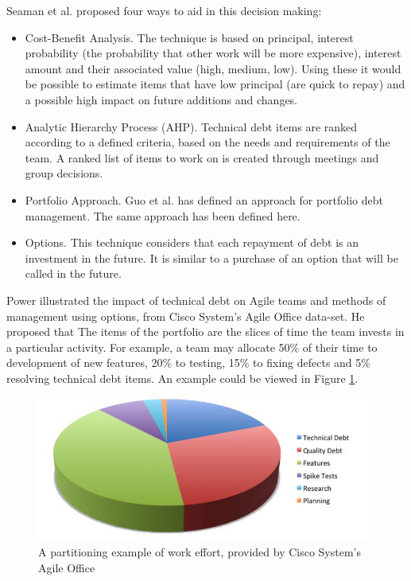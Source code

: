 \documentclass{mprop}
\begin{document}
Seaman et al. \cite{Seaman2012} proposed four ways to aid in this decision
making:
\begin{itemize}
	\item Cost-Benefit Analysis. The technique is based on principal, interest
	      probability (the probability that other work will be more expensive),
	      interest amount and their associated value (high, medium, low). Using these
	      it would be possible to estimate items that have low principal (are quick to
	      repay) and a possible high impact on future additions and changes.
	\item Analytic Hierarchy Process (AHP). Technical debt items are ranked
	      according to a defined criteria, based on the needs and requirements of the
	      team. A ranked list of items to work on is created through meetings and
	      group decisions.
	\item Portfolio Approach. Guo et al. \cite{Guo2011} has
	      defined an approach for portfolio debt management. The same approach has
	      been defined here.
	\item Options. This technique considers that each repayment of debt is an
	      investment in the future. It is similar to a purchase of an option
	      \cite{option-investopedia} that will be called in the future.
\end{itemize}

Power \cite{Power2013} illustrated the impact of technical debt on Agile teams
and methods of management using options, from Cisco System's Agile Office
data-set. He proposed that The items of the portfolio are the slices of time the
team invests in a particular activity. For example, a team may allocate 50\% of
their time to development of new features, 20\% to testing, 15\% to fixing
defects and 5\% resolving technical debt items. An example could be viewed in
Figure \ref{fig:td-options}.

\begin{figure}
	\centering
	\includegraphics[width=0.5\linewidth]{visualisations/td-options.png}
	\caption{A partitioning example of work effort, provided by Cisco System's Agile Office}
	\label{fig:td-options}
\end{figure}
\end{document}
